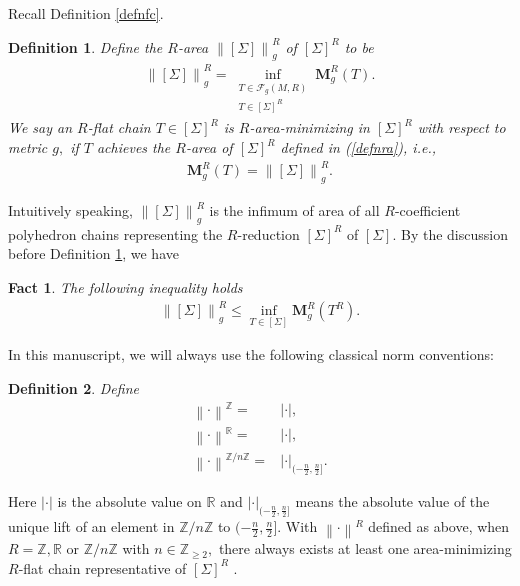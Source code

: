 \documentclass[11pt,a4paper]{amsart}
\numberwithin{equation}{section}
\newcommand{\Si}{\Sigma}
\newcommand{\ms}{\mathbf{M}}
\newcommand{\no}[1]{\left\lVert#1\right\rVert}
\newcommand{\R}{\mathbb{R}}
\newcommand{\Z}{\mathbb{Z}}
\theoremstyle{plain}
\newtheorem{fact}{Fact}[subsection]
\newtheorem{defn}{Definition}[subsection]
\theoremstyle{definition}
\numberwithin{equation}{subsection}
\begin{document}
	Recall Definition \ref{defnfc}.
	\begin{defn}\label{defnrarea}
		Define the $R$-area $\no{[\Si]}^R_g$ of $[\Si]^R$ to be
		\begin{align}\label{defnra}
			\no{[\Si]}^R_g=\inf_{\substack{T\in\mathcal{F}_g(M,R)\\ T\in[\Si]^R}}\ms_g^R(T).
		\end{align}
		We say an $R$-flat chain $T\in[\Si]^R$ is $R$-area-minimizing in $[\Si]^R$ with respect to metric $g,$ if $T$ achieves the $R$-area of $[\Si]^R$ defined in (\ref{defnra}), i.e.,
		\begin{align*}
			\ms^R_g(T)=\no{[\Si]}^R_g.
		\end{align*} 
	\end{defn}
	Intuitively speaking, $\no{[\Si]}^R_g$ is the infimum of area of all $R$-coefficient polyhedron chains representing the $R$-reduction $[\Si]^R$ of $[\Si]$. By the discussion before Definition \ref{defnrarea}, we have
	\begin{fact}
		The following inequality holds
		\begin{align}\label{eqnormcomp}
			\no{[\Si]}^R_g\le \inf_{T\in[\Si]}\ms_g^{R}(T^R).
		\end{align}
	\end{fact}
	In this manuscript, we will always use the following classical norm conventions:
	\begin{defn}\label{defnnorm}Define
		\begin{align*}
			\no{\cdot}^{\Z}=&|\cdot|,\\
			\no{\cdot}^{\R}=&|\cdot|,\\
			\no{\cdot}^{\Z/n\Z}=&|\cdot|_{(-\frac{n}{2},\frac{n}{2}]}.
		\end{align*}
	\end{defn}
	Here $|\cdot|$ is the absolute value on $\R$ and $|\cdot|_{(-\frac{n}{2},\frac{n}{2}]}$ means the absolute value of the unique lift of an element in $\Z/n\Z$ to $(-\frac{n}{2},\frac{n}{2}]$. With $\no{\cdot}^R$ defined as above, when $R=\Z,\R$ or $\Z/n\Z$ with $n\in\Z_{\ge 2},$ there always exists at least one area-minimizing $R$-flat chain representative of $[\Si]^R$ \cite{HFrf,WFfc,HF}. 
	
\end{document}
